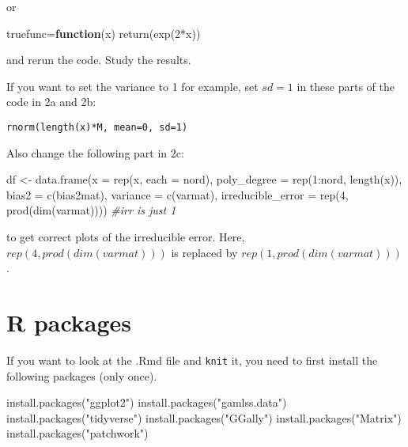 \documentclass[
]{article}
\newenvironment{Shaded}{\begin{snugshade}}{\end{snugshade}}
\newcommand{\AttributeTok}[1]{\textcolor[rgb]{0.77,0.63,0.00}{#1}}
\newcommand{\CommentTok}[1]{\textcolor[rgb]{0.56,0.35,0.01}{\textit{#1}}}
\newcommand{\ControlFlowTok}[1]{\textcolor[rgb]{0.13,0.29,0.53}{\textbf{#1}}}
\newcommand{\DecValTok}[1]{\textcolor[rgb]{0.00,0.00,0.81}{#1}}
\newcommand{\FunctionTok}[1]{\textcolor[rgb]{0.00,0.00,0.00}{#1}}
\newcommand{\NormalTok}[1]{#1}
\newcommand{\OtherTok}[1]{\textcolor[rgb]{0.56,0.35,0.01}{#1}}
\newcommand{\SpecialCharTok}[1]{\textcolor[rgb]{0.00,0.00,0.00}{#1}}
\newcommand{\StringTok}[1]{\textcolor[rgb]{0.31,0.60,0.02}{#1}}
\begin{document}
or

\begin{Shaded}
\begin{Highlighting}[]
\NormalTok{truefunc}\OtherTok{=}\ControlFlowTok{function}\NormalTok{(x) }\FunctionTok{return}\NormalTok{(}\FunctionTok{exp}\NormalTok{(}\DecValTok{2}\SpecialCharTok{*}\NormalTok{x))}
\end{Highlighting}
\end{Shaded}

and rerun the code. Study the results.

If you want to set the variance to 1 for example, set \(sd=1\) in these
parts of the code in 2a and 2b:

\begin{verbatim}
rnorm(length(x)*M, mean=0, sd=1)
\end{verbatim}

Also change the following part in 2c:

\begin{Shaded}
\begin{Highlighting}[]
\NormalTok{df }\OtherTok{\textless{}{-}} \FunctionTok{data.frame}\NormalTok{(}\AttributeTok{x =} \FunctionTok{rep}\NormalTok{(x, }\AttributeTok{each =}\NormalTok{ nord), }\AttributeTok{poly\_degree =} \FunctionTok{rep}\NormalTok{(}\DecValTok{1}\SpecialCharTok{:}\NormalTok{nord, }\FunctionTok{length}\NormalTok{(x)), }
                 \AttributeTok{bias2 =} \FunctionTok{c}\NormalTok{(bias2mat), }\AttributeTok{variance =} \FunctionTok{c}\NormalTok{(varmat), }
                 \AttributeTok{irreducible\_error =} \FunctionTok{rep}\NormalTok{(}\DecValTok{4}\NormalTok{, }\FunctionTok{prod}\NormalTok{(}\FunctionTok{dim}\NormalTok{(varmat)))) }\CommentTok{\#irr is just 1}
\end{Highlighting}
\end{Shaded}

to get correct plots of the irreducible error. Here,
\(rep(4,prod(dim(varmat)))\) is replaced by
\(rep(1,prod(dim(varmat)))\).

\hypertarget{r-packages}{%
\section{\texorpdfstring{ R packages}{ R packages}}\label{r-packages}}

If you want to look at the .Rmd file and \texttt{knit} it, you need to
first install the following packages (only once).

\begin{Shaded}
\begin{Highlighting}[]
\FunctionTok{install.packages}\NormalTok{(}\StringTok{"ggplot2"}\NormalTok{)}
\FunctionTok{install.packages}\NormalTok{(}\StringTok{"gamlss.data"}\NormalTok{)}
\FunctionTok{install.packages}\NormalTok{(}\StringTok{"tidyverse"}\NormalTok{)}
\FunctionTok{install.packages}\NormalTok{(}\StringTok{"GGally"}\NormalTok{)}
\FunctionTok{install.packages}\NormalTok{(}\StringTok{"Matrix"}\NormalTok{)}
\FunctionTok{install.packages}\NormalTok{(}\StringTok{"patchwork"}\NormalTok{)}
\end{Highlighting}
\end{Shaded}
\end{document}
